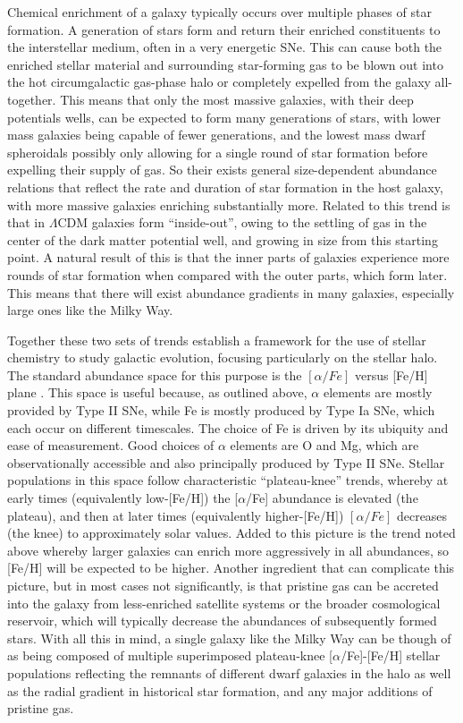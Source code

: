 Chemical enrichment of a galaxy typically occurs over multiple phases of star formation. A generation of stars form and return their enriched constituents to the interstellar medium, often in a very energetic SNe. This can cause both the enriched stellar material and surrounding star-forming gas to be blown out into the hot circumgalactic gas-phase halo or completely expelled from the galaxy all-together. This means that only the most massive galaxies, with their deep potentials wells, can be expected to form many generations of stars, with lower mass galaxies being capable of fewer generations, and the lowest mass dwarf spheroidals possibly only allowing for a single round of star formation before expelling their supply of gas. So their exists general size-dependent abundance relations that reflect the rate and duration of star formation in the host galaxy, with more massive galaxies enriching substantially more. Related to this trend is that in $\Lambda$CDM galaxies form ``inside-out'', owing to the settling of gas in the center of the dark matter potential well, and growing in size from this starting point. A natural result of this is that the inner parts of galaxies experience more rounds of star formation when compared with the outer parts, which form later. This means that there will exist abundance gradients in many galaxies, especially large ones like the Milky Way.

Together these two sets of trends establish a framework for the use of stellar chemistry to study galactic evolution, focusing particularly on the stellar halo. The standard abundance space for this purpose is the $[\alpha/Fe]$ versus [Fe/H] plane \parencite[e.g.][]{hawkins15}. This space is useful because, as outlined above, $\alpha$ elements are mostly provided by Type II SNe, while Fe is mostly produced by Type Ia SNe, which each occur on different timescales. The choice of Fe is driven by its ubiquity and ease of measurement. Good choices of $\alpha$ elements are O and Mg, which are observationally accessible and also principally produced by Type II SNe. Stellar populations in this space follow characteristic ``plateau-knee'' trends, whereby at early times (equivalently low-[Fe/H]) the [$\alpha$/Fe] abundance is elevated (the plateau), and then at later times (equivalently higher-[Fe/H]) $[\alpha/Fe]$ decreases (the knee) to approximately solar values. Added to this picture is the trend noted above whereby larger galaxies can enrich more aggressively in all abundances, so [Fe/H] will be expected to be higher. Another ingredient that can complicate this picture, but in most cases not significantly, is that pristine gas can be accreted into the galaxy from less-enriched satellite systems or the broader cosmological reservoir, which will typically decrease the abundances of subsequently formed stars. With all this in mind, a single galaxy like the Milky Way can be though of as being composed of multiple superimposed plateau-knee [$\alpha$/Fe]-[Fe/H] stellar populations reflecting the remnants of different dwarf galaxies in the halo as well as the radial gradient in historical star formation, and any major additions of pristine gas. 

